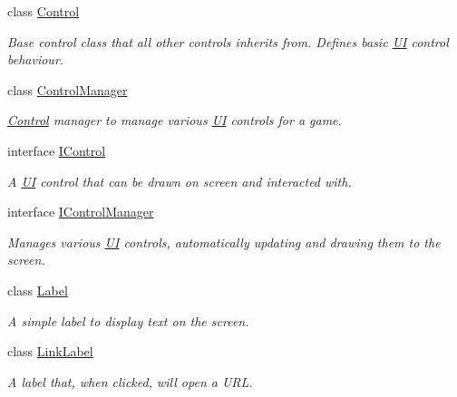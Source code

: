 \begin{DoxyCompactItemize}
\item 
class \hyperlink{class_tri_devs_1_1_tri_engine2_d_1_1_u_i_1_1_control}{Control}
\begin{DoxyCompactList}\small\item\em Base control class that all other controls inherits from. Defines basic \hyperlink{namespace_tri_devs_1_1_tri_engine2_d_1_1_u_i}{U\-I} control behaviour. \end{DoxyCompactList}\item 
class \hyperlink{class_tri_devs_1_1_tri_engine2_d_1_1_u_i_1_1_control_manager}{Control\-Manager}
\begin{DoxyCompactList}\small\item\em \hyperlink{class_tri_devs_1_1_tri_engine2_d_1_1_u_i_1_1_control}{Control} manager to manage various \hyperlink{namespace_tri_devs_1_1_tri_engine2_d_1_1_u_i}{U\-I} controls for a game. \end{DoxyCompactList}\item 
interface \hyperlink{interface_tri_devs_1_1_tri_engine2_d_1_1_u_i_1_1_i_control}{I\-Control}
\begin{DoxyCompactList}\small\item\em A \hyperlink{namespace_tri_devs_1_1_tri_engine2_d_1_1_u_i}{U\-I} control that can be drawn on screen and interacted with. \end{DoxyCompactList}\item 
interface \hyperlink{interface_tri_devs_1_1_tri_engine2_d_1_1_u_i_1_1_i_control_manager}{I\-Control\-Manager}
\begin{DoxyCompactList}\small\item\em Manages various \hyperlink{namespace_tri_devs_1_1_tri_engine2_d_1_1_u_i}{U\-I} controls, automatically updating and drawing them to the screen. \end{DoxyCompactList}\item 
class \hyperlink{class_tri_devs_1_1_tri_engine2_d_1_1_u_i_1_1_label}{Label}
\begin{DoxyCompactList}\small\item\em A simple label to display text on the screen. \end{DoxyCompactList}\item 
class \hyperlink{class_tri_devs_1_1_tri_engine2_d_1_1_u_i_1_1_link_label}{Link\-Label}
\begin{DoxyCompactList}\small\item\em A label that, when clicked, will open a U\-R\-L. \end{DoxyCompactList}\end{DoxyCompactItemize}
